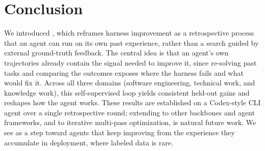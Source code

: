 \section{Conclusion}

We introduced \method{}, which reframes harness improvement as a retrospective process that an agent can run on its own past experience, rather than a search guided by external ground-truth feedback.
The central idea is that an agent's own trajectories already contain the signal needed to improve it, since re-solving past tasks and comparing the outcomes exposes where the harness fails and what would fix it.
Across all three domains (software engineering, technical work, and knowledge work), this self-supervised loop yields consistent held-out gains and reshapes how the agent works.
These results are established on a Codex-style CLI agent over a single retrospective round; extending \method{} to other backbones and agent frameworks, and to iterative multi-pass optimization, is natural future work.
We see \method{} as a step toward agents that keep improving from the experience they accumulate in deployment, where labeled data is rare.
